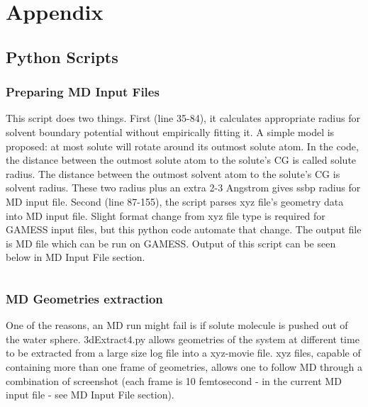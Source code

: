 \documentclass[
journal=jpcbfk, %
manuscript=article]{achemso}
\begin{document}
\clearpage
\appendix 
\label{appendix}
\section*{Appendix}
\renewcommand{\thesubsection}{\Alph{sub}}
	\subsection{Python Scripts}
		\subsubsection{Preparing MD Input Files}
			This script does two things. First (line 35-84), it calculates appropriate radius for solvent boundary potential without empirically fitting it. A simple model is proposed: at most solute will rotate around its outmost solute atom. In the code, the distance between the outmost solute atom to the solute's CG is called solute radius. The distance between the outmost solvent atom to the solute's CG is solvent radius. These two radius plus an extra 2-3 Angstrom gives ssbp radius for MD input file. Second (line 87-155), the script parses xyz file's geometry data into MD input file. Slight format change from xyz file type is required for GAMESS input files, but this python code automate that change. The output file is MD file which can be run on GAMESS. Output of this script can be seen below in MD Input File section.
			\inputminted[linenos, breaklines, baselinestretch=1, fontsize=\small]{python}{../pythonScripts/prepareMD2.py}
		
		\subsubsection{MD Geometries extraction}
			One of the reasons, an MD run might fail is if solute molecule is pushed out of the water sphere. 3dExtract4.py allows geometries of the system at different time to be extracted from a large size log file into a xyz-movie file. xyz files, capable of containing more than one frame of geometries, allows one to follow MD through a combination of screenshot (each frame is 10 femtosecond - in the current MD input file - see MD Input File section). 
			\inputminted[linenos, breaklines, baselinestretch=1, fontsize=\small]{python}{../pythonScripts/3dExtract4.py}
			
\end{document}
